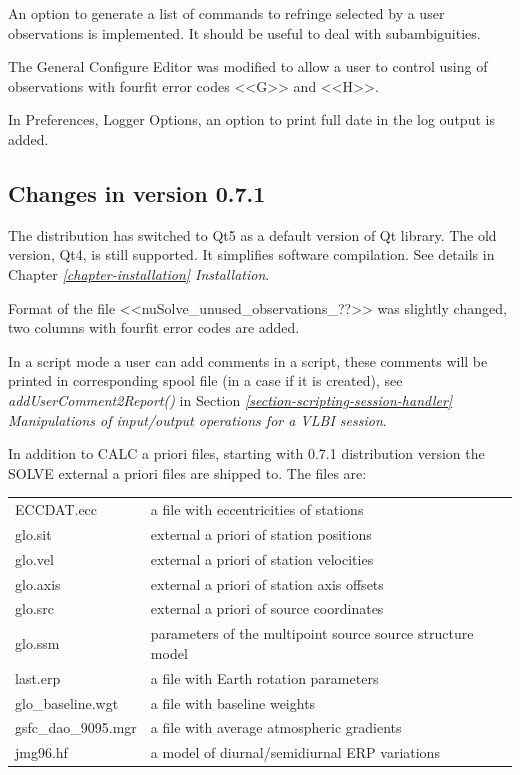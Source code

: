 \documentclass [10pt,letterpaper]{report}
\begin{document}
{An option to generate a list of commands to refringe selected by a user observations is
implemented. It should be useful to deal with subambiguities.

The General Configure Editor was modified to allow a user to control using of observations
with fourfit error codes <<G>> and <<H>>.

In Preferences, Logger Options, an option to print full date in the log output is added.


\subsection{Changes in version 0.7.1}

The distribution has switched to Qt5 as a default version of Qt library. The
old version, Qt4, is still supported. It simplifies software compilation.
See details in Chapter \emph{\ref{chapter-installation} Installation}.

Format of the file <<nuSolve\_unused\_observations\_??>> was slightly changed, two columns
with fourfit error codes are added.

In a script mode a user can add comments in a script, these comments will be printed
in corresponding spool file (in a case if it is created), see {\sl addUserComment2Report()}
in Section \emph{\ref{section-scripting-session-handler}
Manipulations of input/output operations for a VLBI session}.

In addition to CALC a priori files, starting with 0.7.1 distribution version the
SOLVE external a priori files are shipped to. The files are:

\begin{tabular}{ll}
ECCDAT.ecc		& a file with eccentricities of stations \\
glo.sit			& external a priori of station positions \\
glo.vel			& external a priori of station velocities \\
glo.axis		& external a priori of station axis offsets \\
glo.src			& external a priori of source coordinates \\
glo.ssm			& parameters of the multipoint source source structure model \\
last.erp		& a file with Earth rotation parameters \\
glo\_baseline.wgt	& a file with baseline weights\\
gsfc\_dao\_9095.mgr	& a file with average atmospheric gradients\\
jmg96.hf		& a model of diurnal/semidiurnal ERP variations\\
\end{tabular}

}
\end{document}
